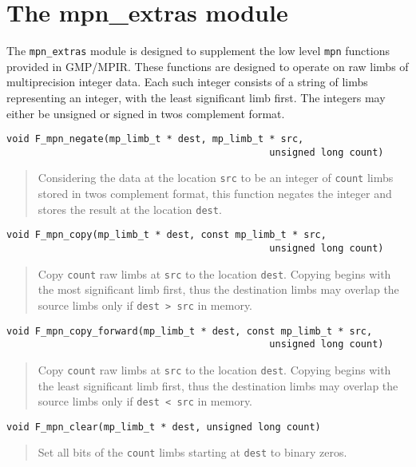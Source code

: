 \documentclass[a4paper,10pt]{article}
\newcommand{\code}{\lstinline}
\begin{document}
\section{The mpn\_extras module}

The \code{mpn_extras} module is designed to supplement the low level \code{mpn} functions provided in GMP/MPIR. These functions are designed to operate on raw limbs of multiprecision integer data. Each such integer consists of a string of limbs representing an integer, with the least significant limb first. The integers may either be unsigned or signed in twos complement format.

\begin{lstlisting}
void F_mpn_negate(mp_limb_t * dest, mp_limb_t * src, 
                                              unsigned long count)
\end{lstlisting}
\begin{quote}
Considering the data at the location \code{src} to be an integer of \code{count} limbs stored in twos complement format, this function negates the integer and stores the result at the location \code{dest}.
\end{quote}

\begin{lstlisting}
void F_mpn_copy(mp_limb_t * dest, const mp_limb_t * src, 
                                              unsigned long count)
\end{lstlisting}
\begin{quote}
Copy \code{count} raw limbs at \code{src} to the location \code{dest}. Copying begins with the most significant limb first, thus the destination limbs may overlap the source limbs only if \code{dest > src} in memory.
\end{quote}

\begin{lstlisting}
void F_mpn_copy_forward(mp_limb_t * dest, const mp_limb_t * src,  
                                              unsigned long count)
\end{lstlisting}
\begin{quote}
Copy \code{count} raw limbs at \code{src} to the location \code{dest}. Copying begins with the least significant limb first, thus the destination limbs may overlap the source limbs only if \code{dest < src} in memory.
\end{quote}

\begin{lstlisting}
void F_mpn_clear(mp_limb_t * dest, unsigned long count)
\end{lstlisting}
\begin{quote}
Set all bits of the \code{count} limbs starting at \code{dest} to binary zeros.
\end{quote}
\end{document}
